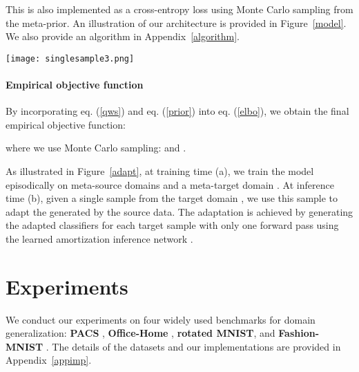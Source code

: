\documentclass{article} \usepackage[table]{xcolor}
\begin{document}
This is also implemented as a cross-entropy loss using Monte Carlo sampling from the meta-prior.
An illustration of our architecture is provided in Figure~\ref{model}. We also provide an algorithm in Appendix~\ref{algorithm}.


\begin{figure*}[t] 
\centering 
\centerline{\texttt{[image: singlesample3.png]}} 
\vspace{-2mm}
\caption{\textbf{Illustration of single sample generalization using meta-learning.} Through variational Bayesian inference, we incorporate the single sample as a conditional during the generation of model parameters. The dashed line indicates training only.  } 
\label{adapt}
\vspace{-2mm}
\end{figure*} 

\vspace{-2mm}
\paragraph{Empirical objective function} 
By incorporating eq. (\ref{qws}) and eq. (\ref{prior}) into eq. (\ref{elbo}), we obtain the final empirical objective function:

where we use Monte Carlo sampling:  and .

As illustrated in Figure~\ref{adapt}, at training time (a), we train the model episodically 
on meta-source domains  and a meta-target domain . At inference time (b), given a single sample  from the target domain , we use this sample to adapt the  generated by the source data. 
The adaptation is achieved by generating the adapted classifiers  for each target sample with only one forward pass using the learned amortization inference network .


\vspace{-1mm}
\section{Experiments}
\vspace{-1mm}

We conduct our experiments on four widely used benchmarks for domain generalization: \textbf{PACS} \citep{li2017deeper}, \textbf{Office-Home} \citep{venkateswara2017deep}, \textbf{rotated MNIST}, and \textbf{Fashion-MNIST} \citep{piratla2020efficient}.
The details of the datasets and our implementations are provided in Appendix~\ref{appimp}.
\end{document}
